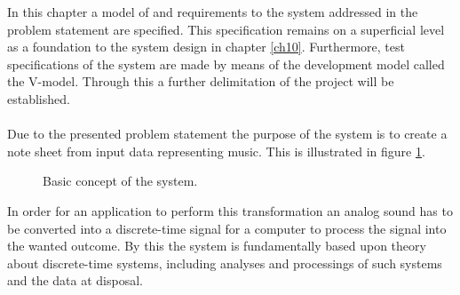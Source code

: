 In this chapter a model of and requirements to the system addressed in the problem statement are specified. This specification remains on a superficial level as a foundation to the system design in chapter \ref{ch10}. Furthermore, test specifications of the system are made by means of the development model called the V-model. Through this a further delimitation of the project will be established. \\   
\\
Due to the presented problem statement the purpose of the system is to create a note sheet from input data representing music. This is illustrated in figure \ref{fig:model1}.    
\begin{figure}[H]
\centering
{}
\caption{Basic concept of the system.}
\label{fig:model1}
\end{figure}
In order for an application to perform this transformation an analog sound has to be converted into a discrete-time signal for a computer to process the signal into the wanted outcome.
By this the system is fundamentally based upon theory about discrete-time systems, including analyses and processings of such systems and the data at disposal.

